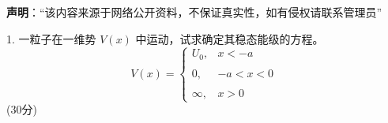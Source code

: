 
\textbf{声明}：“该内容来源于网络公开资料，不保证真实性，如有侵权请联系管理员”

1. 一粒子在一维势 \( V(x) \) 中运动，试求确定其稳态能级的方程。
$$V(x) = \begin{cases} U_0, & x < -a \\\\0, & -a < x < 0 \\\\\infty, & x > 0 \end{cases}~$$
(30分)


